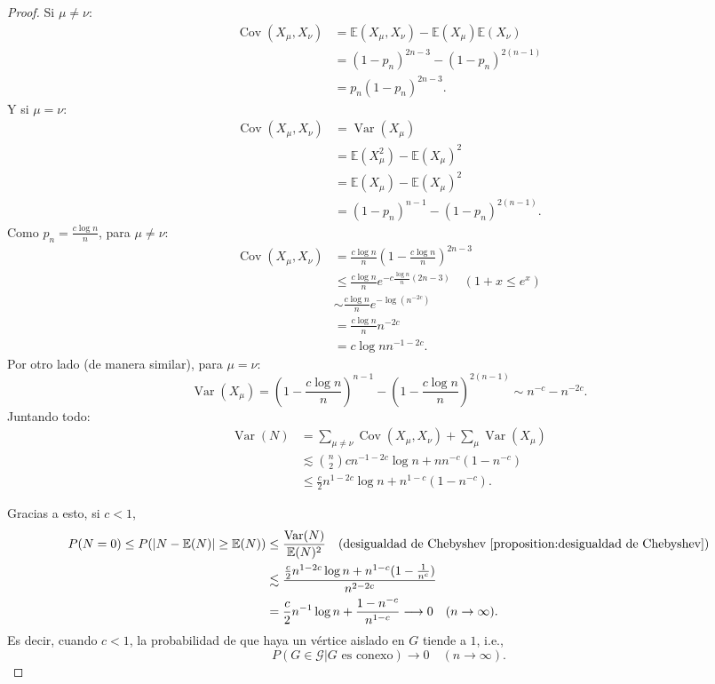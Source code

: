 \documentclass[12pt]{report}
\theoremstyle{plain}
\theoremstyle{definition}
\newcommand{\abs}[1]{\left \vert #1 \right \vert}
\begin{document}
\begin{proof}
Si $\mu \neq \nu$:
\begin{align*}
\operatorname{Cov} (X_\mu, X_\nu) &= \mathbb{E} (X_\mu, X_\nu) - \mathbb{E} (X_\mu) \mathbb{E} (X_\nu) \\
&= (1-p_n)^{2n-3} - (1-p_n)^{2(n-1)} \\
&= p_n (1-p_n)^{2n-3}.
\end{align*}
Y si $\mu = \nu$:
\begin{align*}
\operatorname{Cov} (X_\mu , X_\nu) &= \operatorname{Var} (X_\mu) \\
&= \mathbb{E} (X_\mu^2) - \mathbb{E}(X_\mu)^2\\
&= \mathbb{E} (X_\mu) - \mathbb{E} (X_\mu)^2 \\
&= (1-p_n)^{n-1} - (1-p_n)^{2(n-1)}.
\end{align*}
Como $p_n = \frac{c \log n}{n}$, para $\mu \neq \nu$:
\begin{align*}
\operatorname{Cov} (X_\mu, X_\nu) &= \frac{c \log n}{n} (1 - \frac{c \log n}{n} )^{2n - 3 } \\
&\leq \frac{c \log n}{n} e^{-c \frac{\log n}{n} (2n-3)}  \quad (1 + x \leq e^x) \\
&\sim \frac{c \log n}{n} e^{- \log (n^{-2c})} \\
&= \frac{c\log n}{n} n^{-2 c} \\
&= c \log n n^{-1 - 2 c}.
\end{align*}
Por otro lado (de manera similar), para $\mu = \nu$:
\[
    \operatorname{Var} (X_\mu) = (1- \frac{c\log n}{n})^{n-1} - (1- \frac{c \log n }{n})^{2(n-1)} \sim n^{-c} - n^{-2c}.
\]
Juntando todo:
\begin{align*}
\operatorname{Var} (N) &= \sum_{\mu \neq \nu} \operatorname{Cov} (X_\mu, X_\nu) + \sum_{\mu} \operatorname{Var} (X_\mu) \\
&\lesssim \binom n 2 cn^{-1 -2 c} \log n + n n^{-c} (1- n^{-c}) \\
&\leq \frac c 2 n^{1-2c} \log n + n^{1-c} (1-n^{-c}).
\end{align*}

Gracias a esto, si $c < 1$,
\begin{align*}
P(N = 0) \leq P(\abs{N - \mathbb{E} (N)} \geq \mathbb{E} (N)) &\leq \frac{\operatorname{Var} (N)}{\mathbb{E} (N)^2} \quad (\text{desigualdad de Chebyshev \ref{proposition:desigualdad de Chebyshev}}) \\
&\lesssim \frac{\frac c 2 n^{1-2c} \log n + n^{1-c} (1- \frac 1 {n^c})}{n^{2-2c}} \\
&= \frac{c}{2} n^{-1} \log n + \frac {1 - n^{-c}}{n^{1-c}} \longrightarrow 0 \quad (n \to \infty).
\end{align*}
Es decir, cuando $c < 1$, la probabilidad de que haya un vértice aislado en $G$ tiende a $1$, i.e.,
\[
    P ( G \in \mathcal G | G \text{ es conexo}) \longrightarrow 0 \quad (n \to \infty).
\]


\end{proof}
\end{document}
